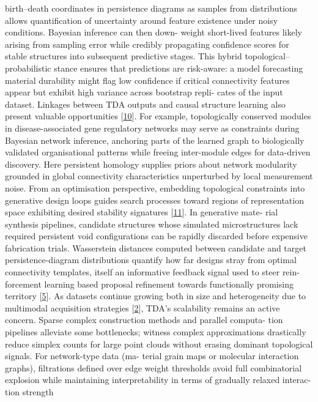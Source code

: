 \documentclass[
]{article}
\begin{document}
birth--death coordinates in persistence diagrams as samples from
distributions allows quantification of uncertainty around feature
existence under noisy conditions. Bayesian inference can then down-
weight short-lived features likely arising from sampling error while
credibly propagating confidence scores for stable structures into
subsequent predictive stages. This hybrid topological--probabilistic
stance ensures that predictions are risk-aware: a model forecasting
material durability might flag low confidence if critical connectivity
features appear but exhibit high variance across bootstrap repli- cates
of the input dataset. Linkages between TDA outputs and causal structure
learning also present valuable opportunities
{[}\hyperref[_bookmark50]{10}{]}. For example, topologically conserved
modules in disease-associated gene regulatory networks may serve as
constraints during Bayesian network inference, anchoring parts of the
learned graph to biologically validated organisational patterns while
freeing inter-module edges for data-driven discovery. Here persistent
homology supplies priors about network modularity grounded in global
connectivity characteristics unperturbed by local measurement noise.
From an optimisation perspective, embedding topological constraints into
generative design loops guides search processes toward regions of
representation space exhibiting desired stability signatures
{[}\hyperref[_bookmark51]{11}{]}. In generative mate- rial synthesis
pipelines, candidate structures whose simulated microstructures lack
required persistent void configurations can be rapidly discarded before
expensive fabrication trials. Wasserstein distances computed between
candidate and target persistence-diagram distributions quantify how far
designs stray from optimal connectivity templates, itself an informative
feedback signal used to steer rein- forcement learning based proposal
refinement towards functionally promising territory
{[}\hyperref[_bookmark45]{5}{]}. As datasets continue growing both in
size and heterogeneity due to multimodal acquisition strategies
{[}\hyperref[_bookmark42]{2}{]}, TDA's scalability remains an active
concern. Sparse complex construction methods and parallel computa- tion
pipelines alleviate some bottlenecks; witness complex approximations
drastically reduce simplex counts for large point clouds without erasing
dominant topological signals. For network-type data (ma- terial grain
maps or molecular interaction graphs), filtrations defined over edge
weight thresholds avoid full combinatorial explosion while maintaining
interpretability in terms of gradually relaxed interac- tion strength
\end{document}

